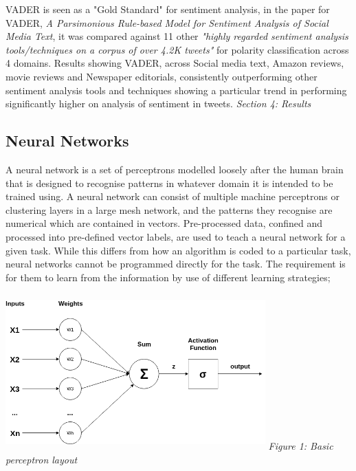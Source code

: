 \documentclass[oneside, 12pt]{article}
\begin{document}
				VADER is seen as a "Gold Standard" for sentiment analysis, in the paper for VADER, \cite{VADERPaper} \textit{A Parsimonious Rule-based Model for Sentiment Analysis of Social Media Text}, it was compared against 11 other \textit{"highly regarded sentiment analysis tools/techniques on a corpus of over 4.2K tweets"} for polarity classification across 4 domains. Results showing VADER, across Social media text, Amazon reviews, movie reviews and Newspaper editorials, consistently outperforming other sentiment analysis tools and techniques showing a particular trend in performing significantly higher on analysis of sentiment in tweets. \cite{VADERPaper} \textit{Section 4: Results}
			
		\subsection{Neural Networks}\label{networks}
			A neural network is a set of perceptrons modelled loosely after the human brain that is designed to recognise patterns in whatever domain it is intended to be trained using. A neural network can consist of multiple machine perceptrons or clustering layers in a large mesh network, and the patterns they recognise are numerical which are contained in vectors. Pre-processed data, confined and processed into pre-defined vector labels, are used to teach a neural network for a given task. While this differs from how an algorithm is coded to a particular task, neural networks cannot be programmed directly for the task. The requirement is for them to learn from the information by use of different learning strategies; \cite{NNDLBegin}\cite{WhatNN}
			
			\begin{center}
				\includegraphics[width=10cm,height=6cm]{images/perceptron.png}
				\newline
				\textit{Figure 1: Basic perceptron layout}
			\end{center}
			
\end{document}
